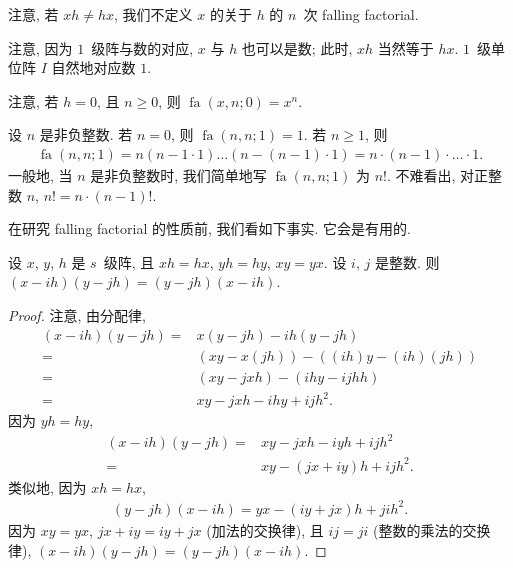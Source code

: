 \documentclass[../libro.tex]{subfiles}
\begin{document}
注意, 若 \(x h \neq h x\),
我们不定义 \(x\) 的关于 \(h\) 的 \(n\)~次 falling factorial.

注意, 因为 \(1\)~级阵与数的对应, \(x\) 与 \(h\) 也可以是数;
此时, \(x h\) 当然等于 \(h x\).
\(1\)~级单位阵 \(I\) 自然地对应数 \(1\).

注意, 若 \(h = 0\), 且 \(n \geq 0\), 则
\(\operatorname{fa} {(x, n; 0)} = x^n\).

\begin{example}
    设 \(n\) 是非负整数.
    若 \(n = 0\), 则 \(\operatorname{fa} {(n, n; 1)} = 1\).
    若 \(n \geq 1\), 则
    \begin{align*}
        \operatorname{fa} {(n, n; 1)} = n (n - 1 \cdot 1) \dots (n - (n - 1) \cdot 1) = n \cdot (n - 1) \cdot \dots \cdot 1.
    \end{align*}
    一般地, 当 \(n\) 是非负整数时, 我们简单地写
    \(\operatorname{fa} {(n, n; 1)}\)
    为 \(n!\).
    不难看出, 对正整数 \(n\),
    \(n! = n \cdot (n - 1)!\).
\end{example}

在研究 falling factorial 的性质前,
我们看如下事实.
它会是有用的.

\begin{theorem}
    设 \(x\), \(y\), \(h\) 是 \(s\)~级阵,
    且 \(x h = h x\), \(y h = h y\), \(x y = y x\).
    设 \(i\), \(j\) 是整数.
    则 \((x - i h) (y - j h) = (y - j h) (x - i h)\).
\end{theorem}

\begin{proof}
    注意, 由分配律,
    \begin{align*}
        (x - i h) (y - j h)
        = {} & x (y - j h) - i h (y - j h)
        \\
        = {} & (x y - x (j h)) - ((i h) y - (i h) (j h))
        \\
        = {} & (x y - j x h) - (i h y - i j h h)
        \\
        = {} & x y - j x h - i h y + i j h^2.
    \end{align*}
    因为 \(y h = h y\),
    \begin{align*}
        (x - i h) (y - j h)
        = {} & x y - j x h - i y h + i j h^2
        \\
        = {} & x y - (j x + i y) h + i j h^2.
    \end{align*}
    类似地, 因为 \(x h = h x\),
    \begin{align*}
        (y - j h) (x - i h)
        = y x - (i y + j x) h + j i h^2.
    \end{align*}
    因为 \(x y = y x\),
    \(j x + i y = i y + j x\) (加法的交换律),
    且 \(i j = j i\) (整数的乘法的交换律),
    \((x - i h) (y - j h) = (y - j h) (x - i h)\).
\end{proof}
\end{document}
